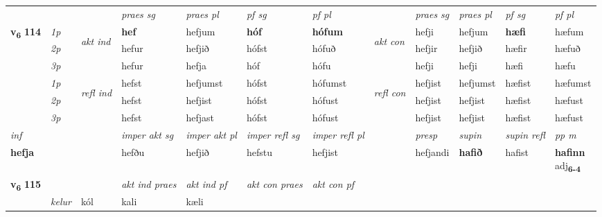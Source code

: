 \begin{longtable}[l]{X>{\footnotesize\itshape}llXXXXlXXXX}
 & &   & \textit{praes sg}  & \textit{praes pl}    & \textit{ pf sg} & \textit{pf pl} & & \textit{praes sg}  & \textit{praes pl}    & \textit{pf sg} & \textit{pf pl }  \\ \cmidrule{4-7} \cmidrule{9-12}
 \multirow{2}{*}{{{\textbf{v{\textsubscript{6}}} \Large{\textbf{114}}}}}  & 1p & \multirow{3}{*}{\begin{turn}{90}\textit{akt ind}\end{turn}} & \textbf{hef} & hefjum & \textbf{hóf} & \textbf{hófum} & \multirow{3}{*}{\begin{turn}{90}\textit{akt con}\end{turn}} &hefji & hefjum & \textbf{hæfi} & hæfum\\*
 & 2p &  &  hefur  & hefjið & hófst & hófuð & & hefjir & hefjið & hæfir & hæfuð \\*
 & 3p &  & hefur & hefja & hóf & hófu & & hefji & hefji& hæfi & hæfu \\*
\cmidrule{4-7} \cmidrule{9-12}
 & 1p & \multirow{3}{*}{\begin{turn}{90}\textit{refl ind}\end{turn}}  & hefst & hefjumst & hófst & hófumst & \multirow{3}{*}{\begin{turn}{90}\textit{refl con}\end{turn}}  &hefjist & hefjumst & hæfist & hæfumst \\*
 & 2p &  & hefst & hefjist & hófst & hófust & &hefjist & hefjist & hæfist & hæfust \\*
 & 3p  & & hefst & hefjast & hófst & hófust & & hefjist & hefjist& hæfist & hæfust \\*
\cmidrule{4-7} \cmidrule{9-12}

   {\textit{inf}} & &  & \textit{imper akt sg} & \textit{imper akt pl} & \textit{imper refl sg} & \textit{imper refl pl} && \textit{presp} & \textit{supin} & \textit{supin refl} & \textit{pp m} \\*
  {\textbf{hefja}} & && hefðu  & hefjið & hefstu & hefjist && hefjandi &  \textbf{hafið} & hafist & \specialcell{\textbf{hafinn} \\ adj\textbf{\textsubscript{6-4}}} \\*

\midrule

\multirow{2}{*}{{{\textbf{v{\textsubscript{6}}} \Large{\textbf{115}}}}}  &&&  \textit{akt ind praes} & \textit{akt ind pf} & \textit{akt con praes} & \textit{akt con pf} \\*
\multicolumn{3}{r}{\textit{e-n}} & kelur & kól & kali & kæli \\*


\end{longtable}
